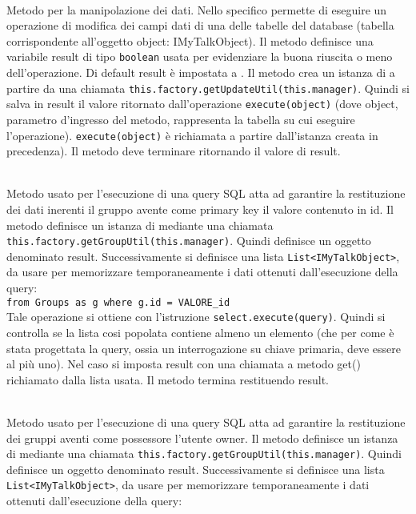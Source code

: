 \begin{description}
	\item{}\\
	Metodo per la manipolazione dei dati. Nello specifico permette di eseguire un operazione di modifica dei campi dati di una delle tabelle del database (tabella corrispondente all'oggetto object: IMyTalkObject). Il metodo definisce una variabile result di tipo \texttt{boolean} usata per evidenziare la buona riuscita o meno dell'operazione. Di default result è impostata a . Il metodo crea un istanza di  a partire da una chiamata \verb|this.factory.getUpdateUtil(this.manager)|. Quindi si salva in result il valore ritornato dall'operazione \verb|execute(object)| (dove object, parametro d'ingresso del metodo, rappresenta la tabella su cui eseguire l'operazione). \verb|execute(object)| è richiamata a partire dall'istanza  creata in precedenza). Il metodo deve terminare ritornando il valore di result.
	
	\item{}\\
	Metodo usato per l'esecuzione di una query SQL atta ad garantire la restituzione dei dati inerenti il gruppo avente come primary key il valore contenuto in id. Il metodo definisce un istanza di  mediante una chiamata \verb|this.factory.getGroupUtil(this.manager)|. Quindi definisce un oggetto  denominato result. Successivamente si definisce una lista \texttt{List<IMyTalkObject>}, da usare per memorizzare temporaneamente i dati ottenuti dall'esecuzione della query:\\
	
	\verb|from Groups as g where g.id = VALORE_id|\\
	
	Tale operazione si ottiene con l'istruzione \verb|select.execute(query)|. Quindi si controlla se la lista cosi popolata contiene almeno un elemento (che per come è stata progettata la query, ossia un interrogazione su chiave primaria, deve essere al più uno). Nel caso si imposta result con una chiamata a metodo get() richiamato dalla lista usata. Il metodo termina restituendo result.
	
		\item{}\\
	Metodo usato per l'esecuzione di una query SQL atta ad garantire la restituzione dei gruppi aventi come possessore l'utente owner. Il metodo definisce un istanza di  mediante una chiamata \verb|this.factory.getGroupUtil(this.manager)|. Quindi definisce un oggetto  denominato result. Successivamente si definisce una lista \texttt{List<IMyTalkObject>}, da usare per memorizzare temporaneamente i dati ottenuti dall'esecuzione della query:\\
	

\end{description}
